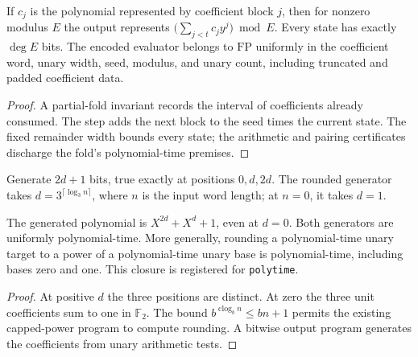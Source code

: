 \begin{theorem}
  \label{thm:lowerbounds-algebraic-bit-horner}
  \leanok
  If $c_j$ is the polynomial represented by coefficient block $j$,
  then for nonzero modulus $E$ the output represents
  $\bigl(\sum_{j<t}c_jy^j\bigr)\bmod E$. Every state has exactly
  $\deg E$ bits. The encoded evaluator belongs to $\mathrm{FP}$
  uniformly in the coefficient word, unary width, seed, modulus,
  and unary count, including truncated and padded coefficient data.
\end{theorem}
\begin{proof}
  \leanok
  A partial-fold invariant records the interval of coefficients
  already consumed. The step adds the next block to the seed times
  the current state. The fixed remainder width bounds every state;
  the arithmetic and pairing certificates discharge the fold's
  polynomial-time premises.
\end{proof}

\begin{definition}
  \label{def:lowerbounds-algebraic-bit-trinomial}
  \leanok
  Generate $2d+1$ bits, true exactly at positions $0,d,2d$.
  The rounded generator takes $d=3^{\lceil\log_3 n\rceil}$,
  where $n$ is the input word length; at $n=0$, it takes $d=1$.
\end{definition}

\begin{theorem}
  \label{thm:lowerbounds-algebraic-bit-trinomial}
  \leanok
  The generated polynomial is $X^{2d}+X^d+1$, even at $d=0$.
  Both generators are uniformly polynomial-time. More generally,
  rounding a polynomial-time unary target to a power of a
  polynomial-time unary base is polynomial-time, including bases
  zero and one. This closure is registered for \texttt{polytime}.
\end{theorem}
\begin{proof}
  \leanok
  At positive $d$ the three positions are distinct. At zero the
  three unit coefficients sum to one in $\mathbb F_2$.
  The bound $b^{\operatorname{clog}_b n}\le bn+1$ permits the existing
  capped-power program to compute rounding. A bitwise output program
  generates the coefficients from unary arithmetic tests.
\end{proof}

